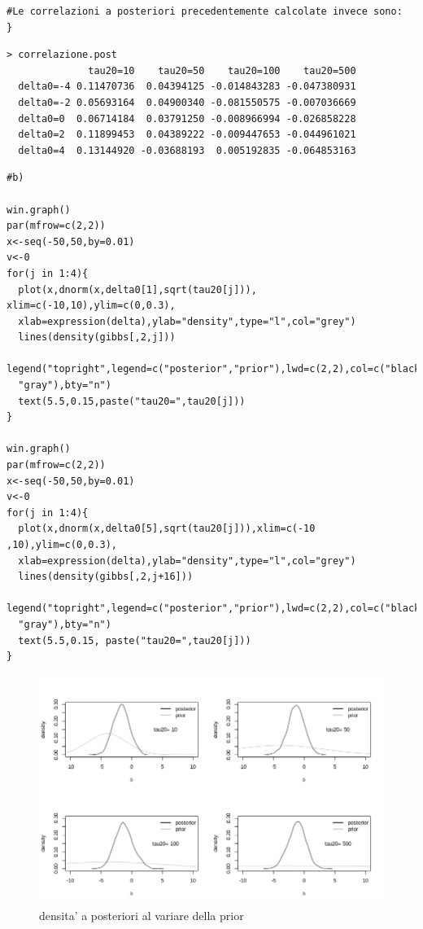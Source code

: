 \begin{itemize}[-]
\begin{lstlisting}[style=R]
#Le correlazioni a posteriori precedentemente calcolate invece sono:
}

\end{lstlisting}

{
\color{red}
\begin{Verbatim}
> correlazione.post
              tau20=10    tau20=50    tau20=100    tau20=500
  delta0=-4 0.11470736  0.04394125 -0.014843283 -0.047380931
  delta0=-2 0.05693164  0.04900340 -0.081550575 -0.007036669
  delta0=0  0.06714184  0.03791250 -0.008966994 -0.026858228
  delta0=2  0.11899453  0.04389222 -0.009447653 -0.044961021
  delta0=4  0.13144920 -0.03688193  0.005192835 -0.064853163
\end{Verbatim}
}


\begin{lstlisting}[style=R]
#b)

win.graph()
par(mfrow=c(2,2))
x<-seq(-50,50,by=0.01)
v<-0
for(j in 1:4){
  plot(x,dnorm(x,delta0[1],sqrt(tau20[j])), xlim=c(-10,10),ylim=c(0,0.3),
  xlab=expression(delta),ylab="density",type="l",col="grey")
  lines(density(gibbs[,2,j]))
  legend("topright",legend=c("posterior","prior"),lwd=c(2,2),col=c("black",
  "gray"),bty="n")
  text(5.5,0.15,paste("tau20=",tau20[j]))
}

win.graph()
par(mfrow=c(2,2))
x<-seq(-50,50,by=0.01)
v<-0
for(j in 1:4){
  plot(x,dnorm(x,delta0[5],sqrt(tau20[j])),xlim=c(-10 ,10),ylim=c(0,0.3),
  xlab=expression(delta),ylab="density",type="l",col="grey")
  lines(density(gibbs[,2,j+16]))
  legend("topright",legend=c("posterior","prior"),lwd=c(2,2),col=c("black",
  "gray"),bty="n")
  text(5.5,0.15, paste("tau20=",tau20[j]))
}

\end{lstlisting}
\begin{figure}
 \centering
 \includegraphics[scale=0.7]{img/esercizio8-2-2}
 \caption{densita' a posteriori al variare della prior}
 \label{figure:figura13}
\end{figure}


\end{itemize}
